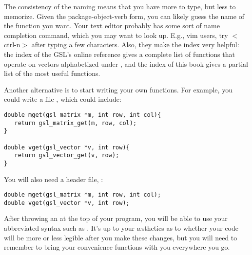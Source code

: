 The consistency of the naming means that you have more to type, but
less to memorize. Given the package-object-verb form, you can likely
guess the name of the function you want. Your text editor probably has
some sort of name completion command, which you may want to look up. E.g.,
vim users, try $<$ctrl-n$>$ after typing a few characters. Also, they
make the index very helpful: the index of the GSL's online reference
gives a complete list of functions that operate on vectors alphabetized
under , and the index of this book gives a partial
list of the most useful functions.


Another alternative is to start writing your own functions. For example, you
could write a file , which could include:

\begin{lstlisting}
double mget(gsl_matrix *m, int row, int col){
   return gsl_matrix_get(m, row, col);
}

double vget(gsl_vector *v, int row){
   return gsl_vector_get(v, row);
}
\end{lstlisting}

You will also need a header file, :
\begin{lstlisting}
double mget(gsl_matrix *m, int row, int col);
double vget(gsl_vector *v, int row);
\end{lstlisting}

After throwing an  at the top of your
program, you will be able to use your abbreviated syntax such as .
It's up to your \ae sthetics as to whether your code will be more or less
legible after you make these changes, but you will need to remember to
bring your convenience functions with you everywhere you go.


